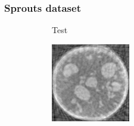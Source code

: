 \documentclass[journal]{IEEEtran}
\begin{document}
\subsubsection{\textbf{Sprouts dataset}}
\label{Sec:sprouts}
\begin{figure}[!h]
    \begin{subfigure}[b]{0.29\linewidth}
        \caption{Test}
     \end{subfigure}
\quad
    \begin{subfigure}[b]{0.3\linewidth}
        \includegraphics[width=\textwidth]{../images/sprouts/fdkIm.png}

\end{subfigure}
\end{figure}
\end{document}
